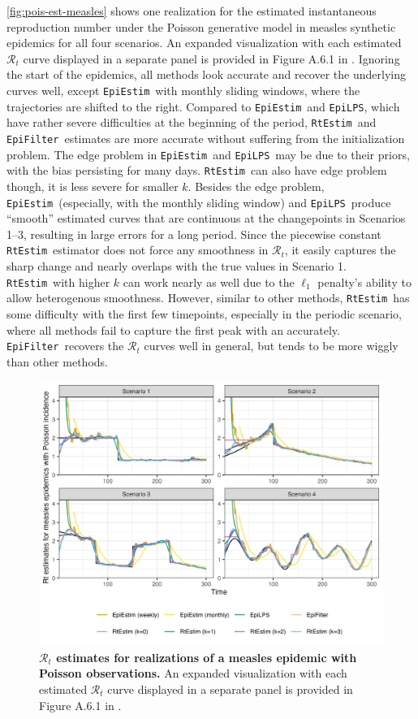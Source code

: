 \documentclass[10pt,letterpaper]{article}
\def\RtEstim{\texttt{RtEstim}}
\def\EpiEstim{\texttt{EpiEstim}}
\def\EpiLPS{\texttt{EpiLPS}}
\def\EpiFilter{\texttt{EpiFilter}}
\def\calR{\mathcal{R}}
\begin{document}
\autoref{fig:pois-est-measles} shows one realization for the estimated
instantaneous reproduction number under the Poisson generative model in measles
synthetic epidemics for all four scenarios. An expanded visualization with each
estimated $\calR_t$ curve displayed in a separate panel is provided in Figure
A.6.1 in . Ignoring the start of the epidemics, all methods look
accurate and recover the underlying curves well, except \EpiEstim\ with monthly
sliding windows, where the trajectories are shifted to the right. Compared to
\EpiEstim\ and \EpiLPS, which have rather severe difficulties at the beginning
of the period, \RtEstim\ and \EpiFilter\ estimates are more accurate without
suffering from the initialization problem. The edge problem in \EpiEstim\ and
\EpiLPS\ may be due to their priors, with the bias persisting for many days.
\RtEstim\ can also have edge problem though, it is less severe for smaller $k$.
Besides the edge problem, \EpiEstim\ (especially, with the monthly sliding
window) and \EpiLPS\ produce ``smooth'' estimated curves that are continuous at
the changepoints in Scenarios 1--3, resulting in large errors for a long period.
Since the piecewise constant \RtEstim\ estimator does not force any smoothness
in $\calR_t$, it easily captures the sharp change and nearly overlaps with the
true values in Scenario 1. \RtEstim\ with higher $k$ can work nearly as well due
to the $\ell_1$ penalty's ability to allow heterogenous smoothness. However,
similar to other methods, \RtEstim\ has some difficulty with the first few
timepoints, especially in the periodic scenario, where all methods fail to
capture the first peak with an accurately. \EpiFilter\ recovers the $\calR_t$
curves well in general, but tends to be more wiggly than other methods. 


\begin{figure}[!t]
  \centering
  \includegraphics[width=1.0\linewidth]{fig/Fig5.png}
  \caption{{\bf $\calR_t$ estimates for realizations of a measles epidemic with
    Poisson observations.} An expanded visualization with each estimated
    $\calR_t$ curve displayed in a separate panel is provided in Figure A.6.1 in
    .}
  \label{fig:pois-est-measles}
\end{figure}
\end{document}
